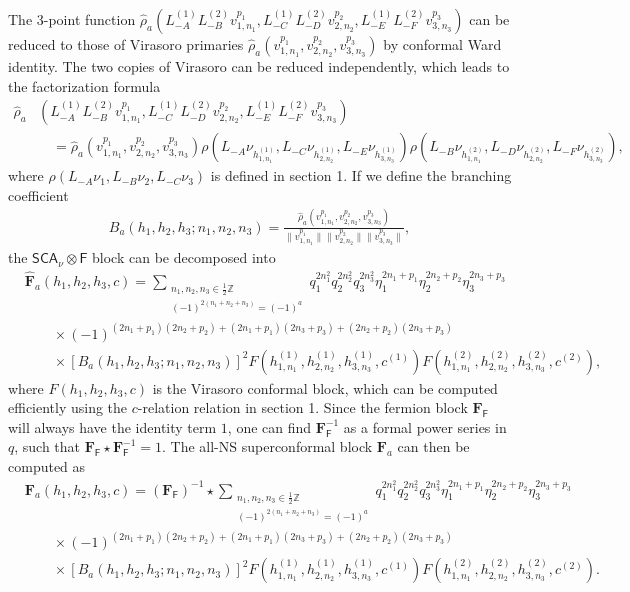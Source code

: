\documentclass[12pt]{article}
\newcommand{\ie}{\begin{equation}\begin{aligned}}
\newcommand{\fe}{\end{aligned}\end{equation}}
\numberwithin{equation}{section}
\begin{document}
The 3-point function $\hat{\rho}_a(L_{-A}^{(1)}L_{-B}^{(2)}v^{p_1}_{1,n_1},L_{-C}^{(1)}L_{-D}^{(2)}v^{p_2}_{2,n_2},L_{-E}^{(1)}L_{-F}^{(2)}v^{p_3}_{3,n_3})$ can be reduced to those of Virasoro primaries $\hat{\rho}_a(v^{p_1}_{1,n_1}, v^{p_2}_{2,n_2}, v^{p_3}_{3,n_3})$ by conformal Ward identity. The two copies of Virasoro can be reduced independently, which leads to the factorization formula
\ie
\hat{\rho}_a&(L_{-A}^{(1)}L_{-B}^{(2)}v^{p_1}_{1,n_1},L_{-C}^{(1)}L_{-D}^{(2)}v^{p_2}_{2,n_2},L_{-E}^{(1)}L_{-F}^{(2)}v^{p_3}_{3,n_3})\\
&\quad =\hat{\rho}_a(v^{p_1}_{1,n_1}, v^{p_2}_{2,n_2}, v^{p_3}_{3,n_3})\rho(L_{-A}\nu_{h_{1,n_1}^{(1)}}, L_{-C}\nu_{h_{2,n_2}^{(1)}}, L_{-E}\nu_{h_{3,n_3}^{(1)}})\rho(L_{-B}\nu_{h_{1,n_1}^{(2)}}, L_{-D}\nu_{h_{2,n_2}^{(2)}}, L_{-F}\nu_{h_{3,n_3}^{(2)}}),
\fe
where $\rho(L_{-A}\nu_1, L_{-B}\nu_2, L_{-C}\nu_3)$ is defined in section 1. If we define the branching coefficient
\ie
B_a(h_1, h_2, h_3;n_1, n_2, n_3) = \frac{\hat{\rho}_a(v^{p_1}_{1,n_1}, v^{p_2}_{2,n_2}, v^{p_3}_{3,n_3})}{\|v^{p_1}_{1,n_1}\|\|v^{p_2}_{2,n_2}\|\|v^{p_3}_{3,n_3}\|},
\fe
the $\mathsf{SCA}_\nu \otimes \mathsf{F}$ block can be decomposed into
\ie
&\widehat{\mathbf{F}}_a(h_1, h_2, h_3, c) = \sum_{\substack{n_1, n_2, n_3\in \frac{1}{2}\mathbb{Z} \\ (-1)^{2(n_1+n_2+n_3)}=(-1)^a}} q_1^{2n_1^2}q_2^{2n_2^2}q_3^{2n_3^2}\eta_1^{2n_1+p_1}\eta_2^{2n_2+p_2}\eta_3^{2n_3+p_3}\\
&\qquad\times (-1)^{(2n_1+p_1)(2n_2+p_2)+(2n_1+p_1)(2n_3+p_3)+(2n_2+p_2)(2n_3+p_3)}\\
&\qquad \times [B_a(h_1,h_2,h_3;n_1,n_2,n_3)]^2 F(h_{1,n_1}^{(1)},h_{2,n_2}^{(1)},h_{3,n_3}^{(1)},c^{(1)})F(h_{1,n_1}^{(2)},h_{2,n_2}^{(2)},h_{3,n_3}^{(2)},c^{(2)}),
\fe
where $F(h_1, h_2, h_3, c)$ is the Virasoro conformal block, which can be computed efficiently using the $c$-relation relation in section 1. Since the fermion block $\mathbf{F}_{\mathsf{F}}$ will always have the identity term $1$, one can find $\mathbf{F}_{\mathsf{F}}^{-1}$ as a formal power series in $q$, such that $\mathbf{F}_{\mathsf{F}}\star \mathbf{F}_{\mathsf{F}}^{-1}=1$. The all-NS superconformal block $\mathbf{F}_a$ can then be computed as
\ie
&\mathbf{F}_a(h_1, h_2, h_3, c) = (\mathbf{F}_{\mathsf{F}})^{-1}\star \sum_{\substack{n_1, n_2, n_3\in \frac{1}{2}\mathbb{Z} \\ (-1)^{2(n_1+n_2+n_3)}=(-1)^a}} q_1^{2n_1^2}q_2^{2n_2^2}q_3^{2n_3^2}\eta_1^{2n_1+p_1}\eta_2^{2n_2+p_2}\eta_3^{2n_3+p_3}\\
&\qquad\times (-1)^{(2n_1+p_1)(2n_2+p_2)+(2n_1+p_1)(2n_3+p_3)+(2n_2+p_2)(2n_3+p_3)}\\
&\qquad \times [B_a(h_1,h_2,h_3;n_1,n_2,n_3)]^2 F(h_{1,n_1}^{(1)},h_{2,n_2}^{(1)},h_{3,n_3}^{(1)},c^{(1)})F(h_{1,n_1}^{(2)},h_{2,n_2}^{(2)},h_{3,n_3}^{(2)},c^{(2)}).
\fe
\end{document}
